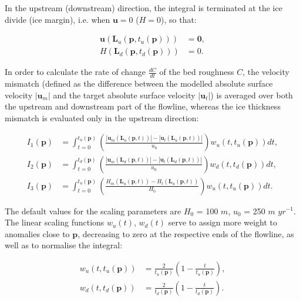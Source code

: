 \documentclass{article}
\begin{document}
In the upstream (downstream) direction, the integral is terminated at the ice divide (ice margin), i.e. when $\textbf{u}=0$ ($H=0$), so that:

\begin{align}
\textbf{u} \left( \textbf{L}_u \left( \textbf{p}, t_u \left( \textbf{p} \right) \right) \right) &= \textbf{0}, \\
H \left( \textbf{L}_d \left( \textbf{p}, t_d \left( \textbf{p} \right) \right) \right) &= 0.
\end{align}

In order to calculate the rate of change $\frac{dC}{dt}$ of the bed roughness $C$, the velocity mismatch (defined as the difference between the modelled absolute surface velocity $\left| \textbf{u}_m \right|$ and the target absolute surface velocity $\left| \textbf{u}_t \right|$) is averaged over both the upstream and downstream part of the flowline, whereas the ice thickness mismatch is evaluated only in the upstream direction:

\begin{align} \label{eq:BIV_01}
I_1(\textbf{p}) &= \int_{t=0}^{t_u(\textbf{p})} \left( 
\frac{
\left| \textbf{u}_m \left( \textbf{L}_u \left( \textbf{p},t \right) \right) \right| -
\left| \textbf{u}_t \left( \textbf{L}_u \left( \textbf{p},t \right) \right) \right| }
{u_0} \right) w_u \left( t, t_u \left( \textbf{p} \right) \right) dt, \\
I_2(\textbf{p}) &= \int_{t=0}^{t_d(\textbf{p})} \left( 
\frac{
\left| \textbf{u}_m \left( \textbf{L}_d \left( \textbf{p},t \right) \right) \right| -
\left| \textbf{u}_t \left( \textbf{L}_d \left( \textbf{p},t \right) \right) \right| }
{u_0} \right) w_d \left( t, t_d \left( \textbf{p} \right) \right) dt, \\
I_3(\textbf{p}) &= \int_{t=0}^{t_u(\textbf{p})} \left( 
\frac{
H_m \left( \textbf{L}_u \left( \textbf{p},t \right) \right) -
H_t \left( \textbf{L}_u \left( \textbf{p},t \right) \right) }
{H_0} \right) w_u \left( t, t_u \left( \textbf{p} \right) \right) dt.
\end{align}

The default values for the scaling parameters are $H_0$ = 100 $m$, $u_0$ = 250 $m$ $yr^{-1}$. The linear scaling functions $w_u \left( t \right)$, $w_d \left( t \right)$ serve to assign more weight to anomalies close to $\textbf{p}$, decreasing to zero at the respective ends of the flowline, as well as to normalise the integral:

\begin{align}
w_u \left( t, t_u \left( \textbf{p} \right) \right) &= \frac{2}{t_u \left( \textbf{p} \right)}
\left( 1 - \frac{t}{t_u \left( \textbf{p} \right)}\right), \\
w_d \left( t, t_d \left( \textbf{p} \right) \right) &= \frac{2}{t_d \left( \textbf{p} \right)}
\left( 1 - \frac{t}{t_d \left( \textbf{p} \right)}\right).
\end{align}
\end{document}
